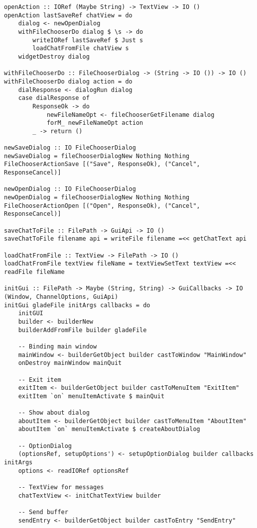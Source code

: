 \documentclass[russian,utf8,simple,emptystyle]{eskdtext}
\begin{document}
\begin{lstlisting}
openAction :: IORef (Maybe String) -> TextView -> IO ()
openAction lastSaveRef chatView = do 
    dialog <- newOpenDialog 
    withFileChooserDo dialog $ \s -> do
        writeIORef lastSaveRef $ Just s 
        loadChatFromFile chatView s
    widgetDestroy dialog 

withFileChooserDo :: FileChooserDialog -> (String -> IO ()) -> IO () 
withFileChooserDo dialog action = do 
    dialResponse <- dialogRun dialog
    case dialResponse of 
        ResponseOk -> do 
            newFileNameOpt <- fileChooserGetFilename dialog
            forM_ newFileNameOpt action
        _ -> return ()

newSaveDialog :: IO FileChooserDialog
newSaveDialog = fileChooserDialogNew Nothing Nothing FileChooserActionSave [("Save", ResponseOk), ("Cancel", ResponseCancel)]

newOpenDialog :: IO FileChooserDialog 
newOpenDialog = fileChooserDialogNew Nothing Nothing FileChooserActionOpen [("Open", ResponseOk), ("Cancel", ResponseCancel)]

saveChatToFile :: FilePath -> GuiApi -> IO ()
saveChatToFile filename api = writeFile filename =<< getChatText api 

loadChatFromFile :: TextView -> FilePath -> IO ()
loadChatFromFile textView fileName = textViewSetText textView =<< readFile fileName

initGui :: FilePath -> Maybe (String, String) -> GuiCallbacks -> IO (Window, ChannelOptions, GuiApi)
initGui gladeFile initArgs callbacks = do 
    initGUI
    builder <- builderNew
    builderAddFromFile builder gladeFile
    
    -- Binding main window
    mainWindow <- builderGetObject builder castToWindow "MainWindow"
    onDestroy mainWindow mainQuit

    -- Exit item
    exitItem <- builderGetObject builder castToMenuItem "ExitItem"
    exitItem `on` menuItemActivate $ mainQuit

    -- Show about dialog
    aboutItem <- builderGetObject builder castToMenuItem "AboutItem"
    aboutItem `on` menuItemActivate $ createAboutDialog

    -- OptionDialog 
    (optionsRef, setupOptions') <- setupOptionDialog builder callbacks initArgs
    options <- readIORef optionsRef

    -- TextView for messages
    chatTextView <- initChatTextView builder 

    -- Send buffer
    sendEntry <- builderGetObject builder castToEntry "SendEntry"


\end{lstlisting}
\end{document}
